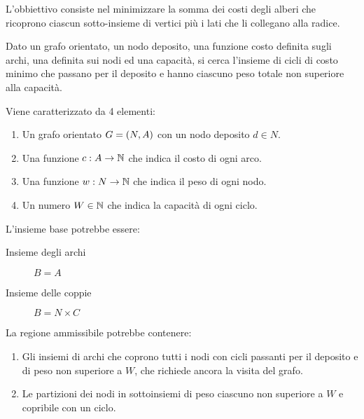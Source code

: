 \documentclass[\main/main.tex]{subfiles}
\begin{document}
\begin{multicols}{2}
\begin{definition}
    \end{definition}
    \begin{definition}
        L'obbiettivo consiste nel minimizzare la somma dei costi degli alberi che ricoprono ciascun sotto-insieme di vertici più i lati che li collegano alla radice.
    \end{definition}
    \begin{problem}
        Dato un grafo orientato, un nodo deposito, una funzione costo definita sugli archi, una definita sui nodi ed una capacità, si cerca l'insieme di cicli di costo minimo che passano per il deposito e hanno ciascuno peso totale non superiore alla capacità.
        
        Viene caratterizzato da 4 elementi:
        \begin{enumerate}
            \item Un grafo orientato \(G = \left(N, A\right)\) con un nodo deposito \(d \in N\).
            \item Una funzione \(c: A \rightarrow \mathbb{N} \) che indica il costo di ogni arco.
            \item Una funzione \(w: N \rightarrow \mathbb{N}\) che indica il peso di ogni nodo.
            \item Un numero \(W \in \mathbb{N}\) che indica la capacità di ogni ciclo.
        \end{enumerate}
    \end{problem}
    \begin{definition}
        L'insieme base potrebbe essere:
        \begin{description}
            \item[Insieme degli archi] \(B = A\)
            \item[Insieme delle coppie] \(B = N \times C\)
        \end{description}
    \end{definition}
    \begin{definition}
        La regione ammissibile potrebbe contenere:
        \begin{enumerate}
            \item Gli insiemi di archi che coprono tutti i nodi con cicli passanti per il deposito e di peso non superiore a \(W\), che richiede ancora la visita del grafo.
            \item Le partizioni dei nodi in sottoinsiemi di peso ciascuno non superiore a \(W\) e copribile con un ciclo.

\end{enumerate}
\end{definition}
\end{multicols}
\end{document}
